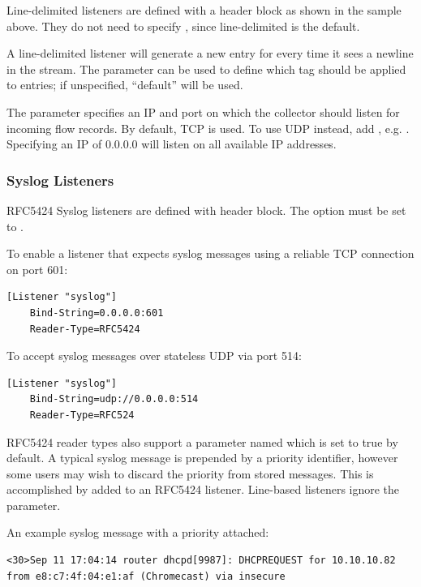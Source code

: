 Line-delimited listeners are defined with a  header block as shown in the sample above. They
do not need to specify , since line-delimited is the
default.

A line-delimited listener will generate a new entry for every time it
sees a newline in the stream. The  parameter can be used to
define which tag should be applied to entries; if unspecified,
``default'' will be used.

The  parameter specifies an IP and port on which
the collector should listen for incoming flow records. By default, TCP is used.
To use UDP instead, add , e.g. .
Specifying an IP of 0.0.0.0 will listen on all available IP addresses.

\subsubsection*{Syslog Listeners}

RFC5424 Syslog listeners are defined with header block. The  option must be
set to .

To enable a listener that expects syslog messages using a reliable TCP
connection on port 601:

\begin{Verbatim}[breaklines=true]
[Listener "syslog"]
    Bind-String=0.0.0.0:601
    Reader-Type=RFC5424
\end{Verbatim}

To accept syslog messages over stateless UDP via port 514:

\begin{Verbatim}[breaklines=true]
[Listener "syslog"]
    Bind-String=udp://0.0.0.0:514
    Reader-Type=RFC524
\end{Verbatim}

RFC5424 reader types also support a parameter named
 which is set to true by default. A typical syslog
message is prepended by a priority identifier, however some users may
wish to discard the priority from stored messages. This is accomplished
by added  to an RFC5424 listener. Line-based listeners ignore the  parameter.

An example syslog message with a priority attached:

\begin{Verbatim}[breaklines=true]
<30>Sep 11 17:04:14 router dhcpd[9987]: DHCPREQUEST for 10.10.10.82 from e8:c7:4f:04:e1:af (Chromecast) via insecure
\end{Verbatim}

